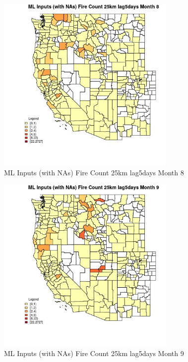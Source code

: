 \begin{figure} 
\centering  
\includegraphics[width=0.77\textwidth]{Code_Outputs/Report_ML_input_PM25_Step4_part_f_de_duplicated_aveswNAs_CountyFire_Count_25km_lag5daysmedianMonth8.jpg} 
\caption{\label{fig:Report_ML_input_PM25_Step4_part_f_de_duplicated_aveswNAsCountyFire_Count_25km_lag5daysmedianMonth8}ML Inputs (with NAs) Fire Count 25km lag5days Month 8} 
\end{figure} 
 

\begin{figure} 
\centering  
\includegraphics[width=0.77\textwidth]{Code_Outputs/Report_ML_input_PM25_Step4_part_f_de_duplicated_aveswNAs_CountyFire_Count_25km_lag5daysmedianMonth9.jpg} 
\caption{\label{fig:Report_ML_input_PM25_Step4_part_f_de_duplicated_aveswNAsCountyFire_Count_25km_lag5daysmedianMonth9}ML Inputs (with NAs) Fire Count 25km lag5days Month 9} 
\end{figure} 
 

